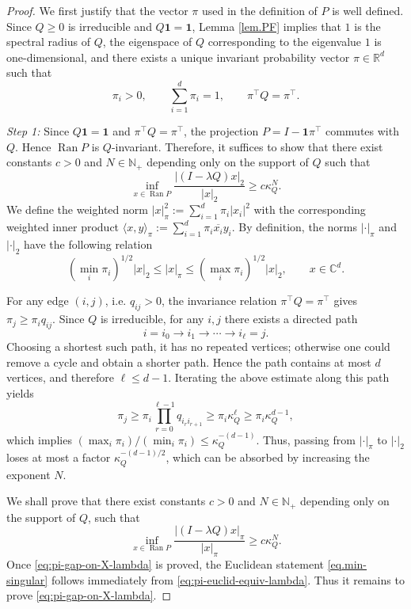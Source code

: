 \documentclass[11pt,twoside, a4paper]{article}
\numberwithin{equation}{section}
\numberwithin{figure}{section}
\theoremstyle{plain} %
\theoremstyle{definition}
\theoremstyle{remark}
\newcommand{\1} {\mspace{1 mu}}
\newcommand{\2} {\mspace{2 mu}}
\newcommand{\R} {\mathbb{R}}
\newcommand{\C} {{\mathbb{C}}}
\newcommand{\N} {{\mathbb{N}}}
\DeclareMathOperator{\Ran}{Ran}
\begin{document}
\begin{proof}
  We first justify that the vector \(\pi\) used in the definition of \(P\) is well defined.
  Since \(Q\ge 0\) is irreducible and \(Q\mathbf 1=\mathbf 1\), Lemma \ref{lem.PF} implies that \(1\) is the spectral radius of \(Q\), the eigenspace of \(Q\) corresponding to the eigenvalue \(1\) is one-dimensional, and there exists a unique invariant probability vector \(\pi\in \R^d\) such that
  \[
  \pi_i>0,\qquad \sum_{i=1}^d \pi_i=1,\qquad \pi^\top Q=\pi^\top .
  \]

\smallskip
\textit{Step 1: }
Since \(Q\mathbf 1=\mathbf 1\) and \(\pi^\top Q=\pi^\top\), the projection \(P=I-\mathbf 1\pi^\top\) commutes with \(Q\). Hence \(\operatorname{Ran}P\) is \(Q\)-invariant.
Therefore, it suffices to show that there exist constants $c>0$ and $N\in\N_+$ depending only on the support of $Q$ such that
\begin{equation}\label{eq.min-singular}
  \inf_{x\in \Ran P}\frac{|(I-\lambda Q)x|_2}{|x|_2}\ge c\kappa_Q^{N} .
\end{equation}
We define the weighted norm $ |x|_\pi^2:=\sum_{i=1}^d \pi_i |x_i|^2$ with the corresponding weighted inner product $\langle x,y\rangle_\pi:=\sum_{i=1}^{d}\pi_i \overline {x_i}y_i$.
By definition, the norms \(|\cdot|_\pi\) and \(|\cdot|_2\) have the following relation
\begin{equation}\label{eq:pi-euclid-equiv-lambda}
(\min_i\pi_i)^{1/2}|x|_2\le |x|_\pi \le (\max_i\pi_i)^{1/2}|x|_2,\qquad x\in \C^d.
\end{equation}


For any edge \((i,j)\), i.e. \(q_{ij}>0\), the invariance relation
\(\pi^\top Q=\pi^\top\) gives
$
  \pi_j\ge \pi_i q_{ij}.
$
Since \(Q\) is irreducible, for any \(i,j\) there exists a directed path
\[
  i=i_0\to i_1\to\cdots\to i_\ell=j .
\]
Choosing a shortest such path, it has no repeated vertices; otherwise one could
remove a cycle and obtain a shorter path. Hence the path contains at most \(d\)
vertices, and therefore \(\ell\le d-1\). Iterating the
above estimate along this path yields
\[
  \pi_j
  \ge \pi_i \prod_{r=0}^{\ell-1}q_{i_r i_{r+1}}
  \ge \pi_i \kappa_Q^\ell
  \ge \pi_i \kappa_Q^{d-1},
\]
which implies 
$
  (\max_i\pi_i)/(\min_i\pi_i)\le \kappa_Q^{-(d-1)} .
$
Thus, passing from \(|\cdot|_\pi\) to \(|\cdot|_2\) loses at most a factor \(\kappa_Q^{-(d-1)/2}\), which can be absorbed by increasing the exponent \(N\).


We shall prove that there exist constants \(c>0\) and $N\in\N_+$ depending only on the support of \(Q\), such that
\begin{equation}\label{eq:pi-gap-on-X-lambda}
\inf_{x\in\Ran P}\frac{|(I-\lambda Q)x|_\pi }{|x|_\pi}\ge c\kappa_Q^N.
\end{equation}
Once \eqref{eq:pi-gap-on-X-lambda} is proved, the Euclidean statement \eqref{eq.min-singular} follows immediately from \eqref{eq:pi-euclid-equiv-lambda}.  
Thus it remains to prove \eqref{eq:pi-gap-on-X-lambda}.


\end{proof}
\end{document}
